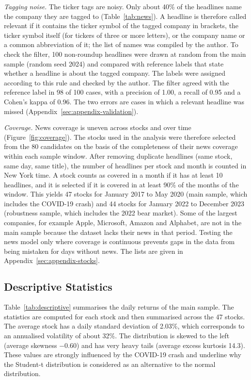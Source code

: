 \documentclass[12pt,a4paper]{article}
\begin{document}
\emph{Tagging noise.} The ticker tags are noisy. Only about 40\% of the headlines name the company they are tagged to (Table~\ref{tab:news}). A headline is therefore called relevant if it contains the ticker symbol of the tagged company in brackets, the ticker symbol itself (for tickers of three or more letters), or the company name or a common abbreviation of it; the list of names was compiled by the author. To check the filter, 100 non-roundup headlines were drawn at random from the main sample (random seed 2024) and compared with reference labels that state whether a headline is about the tagged company. The labels were assigned according to this rule and checked by the author. The filter agreed with the reference label in 98 of 100 cases, with a precision of 1.00, a recall of 0.95 and a Cohen's kappa of 0.96. The two errors are cases in which a relevant headline was missed (Appendix~\ref{sec:appendix-validation}).

\emph{Coverage.} News coverage is uneven across stocks and over time (Figure~\ref{fig:coverage}). The stocks used in the analysis were therefore selected from the 80 candidates on the basis of the completeness of their news coverage within each sample window. After removing duplicate headlines (same stock, same day, same title), the number of headlines per stock and month is counted in New York time. A stock counts as covered in a month if it has at least 10 headlines, and it is selected if it is covered in at least 90\% of the months of the window. This yields 47 stocks for January 2017 to May 2020 (main sample, which includes the COVID-19 crash) and 44 stocks for January 2022 to December 2023 (robustness sample, which includes the 2022 bear market). Some of the largest companies, for example Apple, Microsoft, Amazon and Alphabet, are not in the main sample because the dataset lacks their news in that period. Testing the news model only where coverage is continuous prevents gaps in the data from being mistaken for days without news. The lists are given in Appendix~\ref{sec:appendix-stocks}.

\subsection{Descriptive Statistics}\label{sec:data-descriptive}
Table~\ref{tab:descriptive} summarises the daily returns of the main sample. The statistics are computed for each stock and then summarised across the 47 stocks. The average stock has a daily standard deviation of 2.03\%, which corresponds to an annualised volatility of about 32\%. The distribution is skewed to the left (average skewness $-0.60$) and has very heavy tails (average excess kurtosis 14.3). These values are strongly influenced by the COVID-19 crash and underline why the Student-t distribution is considered as an alternative to the normal distribution.
\end{document}
